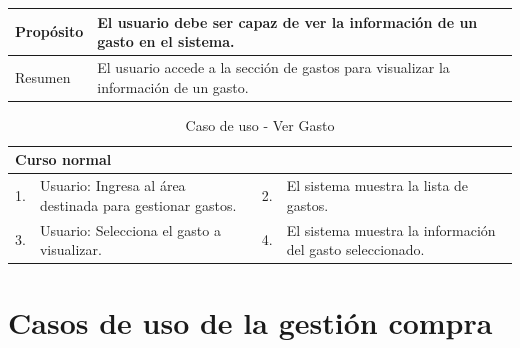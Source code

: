 \begin{table}[H]
    \centering
    \begin{tabular}{| m{} | m{} | m{} | m{} |}
        \hline
        Propósito & \multicolumn{3}{m{0.67\textwidth}|}{El usuario debe ser capaz de ver la información de un gasto en el sistema.} \\ 
        \hline
        Resumen & \multicolumn{3}{m{0.67\textwidth}|}{El usuario accede a la sección de gastos para visualizar la información de un gasto.} \\ 
        \hline
    \end{tabular}
\end{table}

\begin{table}[H]
    \centering
    \begin{tabular}{| m{} | m{} | m{} | m{} |}
        \hline
        \multicolumn{4}{|m{0.9\textwidth}|}{Curso normal} \\ 
        \hline
        1. & Usuario: Ingresa al área destinada para gestionar gastos.
        & 2. & El sistema muestra la lista de gastos. \\ 
        \hline
        3. & Usuario: Selecciona el gasto a visualizar. 
        & 4. & El sistema muestra la información del gasto seleccionado. \\ 
        \hline
    \end{tabular}
    \caption{Caso de uso - Ver Gasto}
\end{table}

\clearpage

\section{Casos de uso de la gestión compra}

